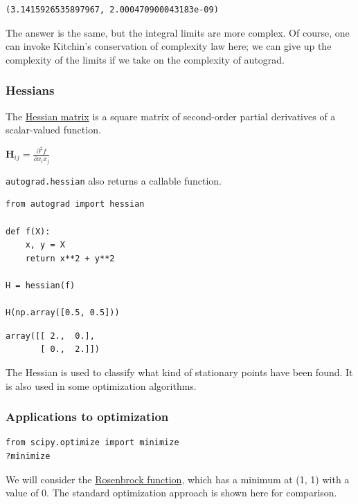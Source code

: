 \documentclass[11pt]{article}
\begin{document}
\begin{verbatim}
(3.1415926535897967, 2.000470900043183e-09)
\end{verbatim}

The answer is the same, but the integral limits are more complex. Of course, one can invoke Kitchin's conservation of complexity law here; we can give up the complexity of the limits if we take on the complexity of autograd.

\subsubsection{Hessians}
\label{sec:orgb7c9508}

The \href{https://en.wikipedia.org/wiki/Hessian\_matrix}{Hessian matrix} is a square matrix of second-order partial derivatives of a scalar-valued function.

\(\mathbf{H}_{ij} = \frac{\partial^2 f}{\partial x_i x_j}\)

\texttt{autograd.hessian} also returns a callable function.

\begin{verbatim}
from autograd import hessian

def f(X):
    x, y = X
    return x**2 + y**2

H = hessian(f)

H(np.array([0.5, 0.5]))
\end{verbatim}

\begin{verbatim}
array([[ 2.,  0.],
       [ 0.,  2.]])
\end{verbatim}

The Hessian is used to classify what kind of stationary points have been found. It is also used in some optimization algorithms.

\subsubsection{Applications to optimization}
\label{sec:org838f37b}

\begin{verbatim}
from scipy.optimize import minimize
?minimize
\end{verbatim}

We will consider the \href{https://en.wikipedia.org/wiki/Rosenbrock\_function}{Rosenbrock function}, which has a minimum at (1, 1) with a value of 0. The standard optimization approach is shown here for comparison.
\end{document}
